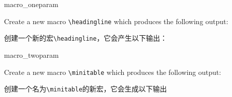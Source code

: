 \begin{dispExample}
\begin{texercise}{macro_oneparam}
\begin{tcboutputlisting}
\newcommand{\headingline}[1]{%
\begin{center}\Large\bfseries #1\end{center}}
\end{tcboutputlisting}
\tcbuselistingtext%

Create a new macro \verb+\headingline+ which produces the
following output:

创建一个新的宏\verb+\headingline+，它会产生以下输出：
\par\smallskip
\begin{tcbwritetemp}
\end{tcbwritetemp}
\tcbusetemplisting\tcbusetemp%
\end{texercise}
\end{dispExample}



\begin{dispExample}
\begin{texercise}{macro_twoparam}
\begin{tcboutputlisting}
\newcommand{\minitable}[2]{%
\begin{center}\begin{tabular}{p{10cm}}\hline%
\multicolumn{1}{c}{\bfseries#1}\\\hline%
#2\\\hline%
\end{tabular}\end{center}}
\end{tcboutputlisting}
\tcbuselistingtext%
Create a new macro \verb+\minitable+ which produces the
following output:

创建一个名为\verb+\minitable+的新宏，它会生成以下输出\par\smallskip
\begin{tcbwritetemp}
\end{tcbwritetemp}
\tcbusetemplisting\par\smallskip\tcbusetemp%
\end{texercise}
\end{dispExample}


